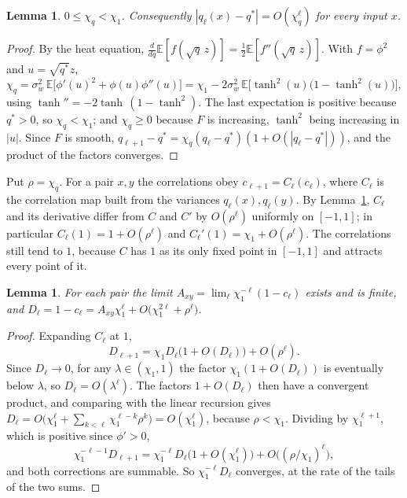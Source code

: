 \documentclass[11pt]{amsart}
\newtheorem{lemma}[theorem]{Lemma}
\theoremstyle{remark}\newtheorem{remark}[theorem]{Remark}
\newcommand{\E}{\mathbb{E}}
\begin{document}
\begin{lemma}\label{lem:chiq}
$0\le\chi_q<\chi_1$. Consequently $|q_\ell(x)-q^*|=O(\chi_q^\ell)$ for every input $x$.
\end{lemma}

\begin{proof}
By the heat equation, $\frac{d}{dq}\E[f(\sqrt q\,z)]=\frac12\E[f''(\sqrt q\,z)]$. With $f=\phi^2$ and $u=\sqrt{q^*}z$,
\[
\chi_q=\sigma_w^2\,\E\big[\phi'(u)^2+\phi(u)\phi''(u)\big]=\chi_1-2\sigma_w^2\,\E\big[\tanh^2(u)\big(1-\tanh^2(u)\big)\big],
\]
using $\tanh''=-2\tanh\,(1-\tanh^2)$. The last expectation is positive because $q^*>0$, so $\chi_q<\chi_1$; and
$\chi_q\ge0$ because $F$ is increasing, $\tanh^2$ being increasing in $|u|$. Since $F$ is smooth,
$q_{\ell+1}-q^*=\chi_q(q_\ell-q^*)(1+O(|q_\ell-q^*|))$, and the product of the factors converges.
\end{proof}

Put $\rho=\chi_q$. For a pair $x,y$ the correlations obey $c_{\ell+1}=C_\ell(c_\ell)$, where $C_\ell$ is the
correlation map built from the variances $q_\ell(x),q_\ell(y)$. By Lemma~\ref{lem:chiq}, $C_\ell$ and its derivative
differ from $C$ and $C'$ by $O(\rho^\ell)$ uniformly on $[-1,1]$; in particular $C_\ell(1)=1+O(\rho^\ell)$ and
$C_\ell'(1)=\chi_1+O(\rho^\ell)$. The correlations still tend to $1$, because $C$ has $1$ as its only fixed point in
$[-1,1]$ and attracts every point of it.

\begin{lemma}\label{lem:offcmap}
For each pair the limit $A_{xy}=\lim_\ell\chi_1^{-\ell}(1-c_\ell)$ exists and is finite, and
$D_\ell=1-c_\ell=A_{xy}\chi_1^\ell+O\big(\chi_1^{2\ell}+\rho^\ell\big)$.
\end{lemma}

\begin{proof}
Expanding $C_\ell$ at $1$,
\[
D_{\ell+1}=\chi_1D_\ell\big(1+O(D_\ell)\big)+O(\rho^\ell).
\]
Since $D_\ell\to0$, for any $\lambda\in(\chi_1,1)$ the factor $\chi_1(1+O(D_\ell))$ is eventually below $\lambda$, so
$D_\ell=O(\lambda^\ell)$. The factors $1+O(D_\ell)$ then have a convergent product, and comparing with the linear
recursion gives $D_\ell=O\big(\chi_1^\ell+\sum_{k<\ell}\chi_1^{\ell-k}\rho^k\big)=O(\chi_1^\ell)$, because $\rho<\chi_1$.
Dividing by $\chi_1^{\ell+1}$, which is positive since $\phi'>0$,
\[
\chi_1^{-\ell-1}D_{\ell+1}=\chi_1^{-\ell}D_\ell\big(1+O(\chi_1^\ell)\big)+O\big((\rho/\chi_1)^\ell\big),
\]
and both corrections are summable. So $\chi_1^{-\ell}D_\ell$ converges, at the rate of the tails of the two sums.
\end{proof}
\end{document}
